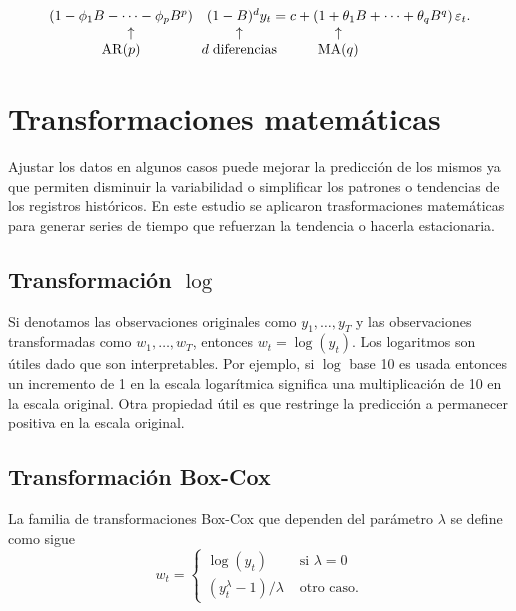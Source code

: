 \begin{equation*}
	\begin{array}{ccc}
		\left(1-\phi_{1} B-\cdots-\phi_{p} B^{p}\right) & (1-B)^{d} y_{t}=c+\left(1+\theta_{1} B+\cdots+\theta_{q} B^{q}\right) \varepsilon_{t}.\\
		\hspace{0.5cm}\uparrow & \hspace{-5cm}\uparrow & \hspace{-7cm}\uparrow \\
		\operatorname{AR}(p) & \hspace{-5cm}d\hspace{0.1cm}\text{diferencias} & \hspace{-7cm}\operatorname{MA}(q)
	\end{array}
\end{equation*}
\section{Transformaciones matemáticas}
\label{transformacionesmatematicas}
Ajustar los datos en algunos casos puede mejorar la predicción de los mismos ya que permiten disminuir la variabilidad o simplificar los patrones o tendencias de los registros históricos. En este estudio se aplicaron trasformaciones matemáticas para generar series de tiempo que refuerzan la tendencia o hacerla estacionaria.


\subsection{Transformación $\log$}

Si denotamos las observaciones originales como $y_{1}, \ldots, y_{T}$ y las observaciones transformadas como $w_{1}, \ldots, w_{T}$, entonces $w_{t}=\log \left(y_{t}\right)$. Los logaritmos son útiles dado que son interpretables. Por ejemplo, si $\log$ base 10 es usada entonces un incremento de 1 en la escala logarítmica significa una multiplicación de 10 en la escala original.  
Otra propiedad útil es que restringe la predicción a permanecer positiva en la escala original. 

\subsection{Transformación Box-Cox}
La familia de transformaciones Box-Cox que dependen del parámetro $\lambda$ se define como sigue
\[
w_{t}= \begin{cases}\log \left(y_{t}\right) & \text { si } \lambda=0 \\ \left(y_{t}^{\lambda}-1\right) / \lambda & \text { otro caso.}\end{cases}
\]

